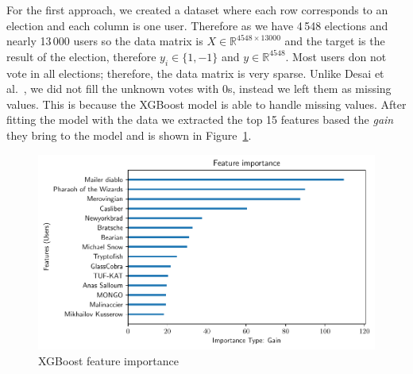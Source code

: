 For the first approach, we created a dataset where each row corresponds to an election and each column is one user. Therefore as we have 4\,548 elections and nearly 13\,000 users so the data matrix is $X\in \mathbb{R}^{4548\times 13000}$ and the target is the result of the election, therefore $y_i\in \{1,-1\}$ and $y\in \mathbb{R}^{4548}$. Most users don not vote in all elections; therefore, the data matrix is very sparse. Unlike Desai et al.\ \cite{desai2014result}, we did not fill the unknown votes with 0s, instead we left them as missing values. This is because the XGBoost model is able to handle missing values. After fitting the model with the data we extracted the top 15 features based the \textit{gain} they bring to the model and is shown in Figure~\ref{fig:xgboost-feat-importance}. 
\begin{figure}[!ht]
    \centering
    \includegraphics[width=\linewidth]{images/xgboost_features.pdf}
    \caption{XGBoost feature importance}
    \label{fig:xgboost-feat-importance}
\end{figure}

